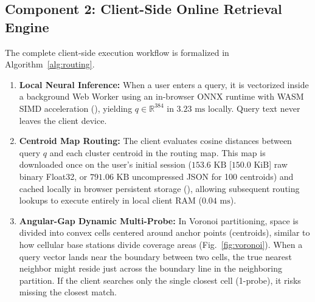 \documentclass[11pt,journal,compsoc,onecolumn]{IEEEtran}
\begin{document}
\subsection{Component 2: Client-Side Online Retrieval Engine}
The complete client-side execution workflow is formalized in Algorithm~\ref{alg:routing}.
\begin{enumerate}
    \item \textbf{Local Neural Inference:} When a user enters a query, it is vectorized inside a background Web Worker using an in-browser ONNX runtime with WASM SIMD acceleration (), yielding $q \in \mathbb{R}^{384}$ in $3.23\text{ ms}$ locally. Query text never leaves the client device.
    \item \textbf{Centroid Map Routing:} The client evaluates cosine distances between query $q$ and each cluster centroid in the routing map. This map is downloaded once on the user's initial session ($153.6\text{ KB}$ [$150.0\text{ KiB}$] raw binary Float32, or $791.06\text{ KB}$ uncompressed JSON for 100 centroids) and cached locally in browser persistent storage (), allowing subsequent routing lookups to execute entirely in local client RAM ($0.04\text{ ms}$).
    \item \textbf{Angular-Gap Dynamic Multi-Probe:} In Voronoi partitioning, space is divided into convex cells centered around anchor points (centroids), similar to how cellular base stations divide coverage areas (Fig.~\ref{fig:voronoi}). When a query vector lands near the boundary between two cells, the true nearest neighbor might reside just across the boundary line in the neighboring partition. If the client searches only the single closest cell (1-probe), it risks missing the closest match.
    

\end{enumerate}
\end{document}

